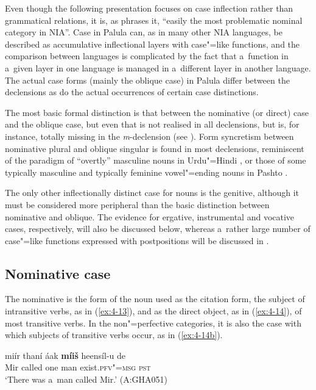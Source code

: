 Even though the following presentation focuses on case inflection rather than grammatical relations, it is, as \citet[230--231]{masica1991} phrases it, ``easily the most problematic nominal category in NIA''. Case in Palula can, as in many other NIA languages, be described as accumulative inflectional layers with case"=like functions, and the comparison between languages is complicated by the fact that a~function in a~given layer in one language is managed in a~different layer in another language. The actual case forms (mainly the oblique case) in Palula differ between the declensions as do the actual occurrences of certain case distinctions. 


The most basic formal distinction is that between the nominative (or direct) case and the oblique case, but even that is not realised in all declensions, but is, for instance, totally missing in the \textit{m}-declension (see ). Form syncretism \citep[27]{matthews1991} between nominative plural and oblique singular is found in most declensions, reminiscent of the paradigm of ``overtly'' masculine nouns in Urdu"=Hindi \citep[1]{schmidt1999}, or those of some typically masculine and typically feminine vowel"=ending nouns in Pashto \citep[726-728]{robsontegey2009}.


The only other inflectionally distinct case for nouns is the genitive, although it must be considered more peripheral than the basic distinction between nominative and oblique. The evidence for ergative, instrumental and vocative cases, respectively, will also be discussed below, whereas a~rather large number of case"=like functions expressed with postpositions will be discussed in .


\subsection{Nominative case}
\label{subsec:4-5-1}

The nominative is the form of the noun used as the citation form, the subject of intransitive verbs, as in (\ref{ex:4-13}), and as the direct object, as in (\ref{ex:4-14}), of most transitive verbs. In the non"=perfective categories, it is also the case with which subjects of transitive verbs occur, as in (\ref{ex:4-14b}). 


\begin{exe}
\ex
\label{ex:4-13}
\gll miír thaní áak \textbf{míiš} heensíl-u de\\
	Mir called one man exist.\textsc{pfv"=msg} \textsc{pst}\\
\glt `There was a~man called Mir.' (A:GHA051)
\end{exe}

